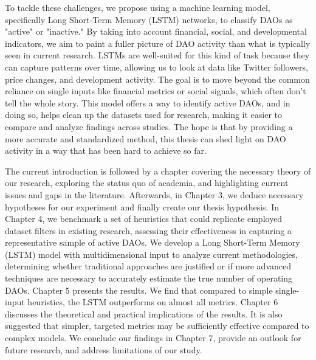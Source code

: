 To tackle these challenges, we propose using a machine learning model, specifically Long Short-Term Memory (LSTM) networks, to classify DAOs as "active" or "inactive." By taking into account financial, social, and developmental indicators, we aim to paint a fuller picture of DAO activity than what is typically seen in current research. LSTMs are well-suited for this kind of task because they can capture patterns over time, allowing us to look at data like Twitter followers, price changes, and development activity. The goal is to move beyond the common reliance on single inputs like financial metrics or social signals, which often don’t tell the whole story. This model offers a way to identify active DAOs, and in doing so, helps clean up the datasets used for research, making it easier to compare and analyze findings across studies. The hope is that by providing a more accurate and standardized method, this thesis can shed light on DAO activity in a way that has been hard to achieve so far.

The current introduction is followed by a chapter covering the necessary theory of our research, exploring the status quo of academia, and highlighting current issues and gaps in the literature. Afterwards, in Chapter 3, we deduce necessary hypotheses for our experiment and finally create our thesis hypothesis.
%
In Chapter 4, we benchmark a set of heuristics that could replicate employed dataset filters in existing research, assessing their effectiveness in capturing a representative sample of active DAOs. We develop a Long Short-Term Memory (LSTM) model with multidimensional input to analyze current methodologies, determining whether traditional approaches are justified or if more advanced techniques are necessary to accurately estimate the true number of operating DAOs.
%
Chapter 5 presents the results. We find that compared to simple single-input heuristics, the LSTM outperforms on almost all metrics.
%
Chapter 6 discusses the theoretical and practical implications of the results. It is also suggested that simpler, targeted metrics may be sufficiently effective compared to complex models.
%
We conclude our findings in Chapter 7, provide an outlook for future research, and address limitations of our study.
